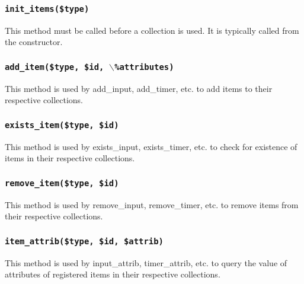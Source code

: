 \subsubsection*{\texttt{init\_items(\$type)}\label{xPL::Base_init_items_type_}}


This method must be called before a collection is used.  It
is typically called from the constructor.

\subsubsection*{\texttt{add\_item(\$type, \$id, $\backslash$\%attributes)}\label{xPL::Base_add_item_type_id_backslash_attributes_}}


This method is used by \textsf{add\_input}, \textsf{add\_timer}, etc. to add
items to their respective collections.

\subsubsection*{\texttt{exists\_item(\$type, \$id)}\label{xPL::Base_exists_item_type_id_}}


This method is used by \textsf{exists\_input}, \textsf{exists\_timer}, etc. to check
for existence of items in their respective collections.

\subsubsection*{\texttt{remove\_item(\$type, \$id)}\label{xPL::Base_remove_item_type_id_}}


This method is used by \textsf{remove\_input}, \textsf{remove\_timer}, etc. to remove
items from their respective collections.

\subsubsection*{\texttt{item\_attrib(\$type, \$id, \$attrib)}\label{xPL::Base_item_attrib_type_id_attrib_}}


This method is used by \textsf{input\_attrib}, \textsf{timer\_attrib}, etc. to query
the value of attributes of registered items in their respective
collections.


